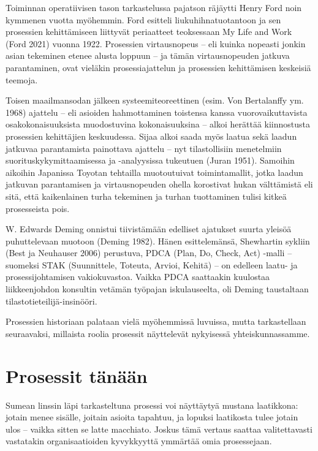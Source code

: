 \documentclass[
  finnish,
  letterpaper,
  DIV=11,
  numbers=noendperiod,
  oneside]{scrreprt}
\begin{document}
Toiminnan operatiivisen tason tarkastelussa pajatson räjäytti Henry Ford
noin kymmenen vuotta myöhemmin. Ford esitteli liukuhihnatuotantoon ja
sen prosessien kehittämiseen liittyvät periaatteet teoksessaan My Life
and Work (Ford 2021) vuonna 1922. Prosessien virtausnopeus -- eli kuinka
nopeasti jonkin asian tekeminen etenee alusta loppuun -- ja tämän
virtausnopeuden jatkuva parantaminen, ovat vieläkin prosessiajattelun ja
prosessien kehittämisen keskeisiä teemoja.

Toisen maailmansodan jälkeen systeemiteoreettinen (esim. {Von
Bertalanffy ym.} 1968) ajattelu -- eli asioiden hahmottaminen toistensa
kanssa vuorovaikuttavista osakokonaisuuksista muodostuvina
kokonaisuuksina -- alkoi herättää kiinnostusta prosessien kehittäjien
keskuudessa. Sijaa alkoi saada myös laatua sekä laadun jatkuvaa
parantamista painottava ajattelu -- nyt tilastollisiin menetelmiin
suorituskykymittaamisessa ja -analyysissa tukeutuen (Juran 1951).
Samoihin aikoihin Japanissa Toyotan tehtailla muotoutuivat
toimintamallit, jotka laadun jatkuvan parantamisen ja virtausnopeuden
ohella korostivat hukan välttämistä eli sitä, että kaikenlainen turha
tekeminen ja turhan tuottaminen tulisi kitkeä prosesseista pois.

W. Edwards Deming onnistui tiivistämään edelliset ajatukset suurta
yleisöä puhuttelevaan muotoon (Deming 1982). Hänen esittelemänsä,
Shewhartin sykliin (Best ja Neuhauser 2006) perustuva, PDCA (Plan, Do,
Check, Act) -malli -- suomeksi STAK (Suunnittele, Toteuta, Arvioi,
Kehitä) -- on edelleen laatu- ja prosessijohtamisen vakiokuvastoa.
Vaikka PDCA saattaakin kuulostaa liikkeenjohdon konsultin vetämän
työpajan iskulauseelta, oli Deming taustaltaan
tilastotieteilijä-insinööri.

Prosessien historiaan palataan vielä myöhemmissä luvuissa, mutta
tarkastellaan seuraavaksi, millaista roolia prosessit näyttelevät
nykyisessä yhteiskunnassamme.

\section{Prosessit tänään}\label{prosessit-tuxe4nuxe4uxe4n}

Sumean linssin läpi tarkasteltuna prosessi voi näyttäytyä mustana
laatikkona: jotain menee sisälle, joitain asioita tapahtuu, ja lopuksi
laatikosta tulee jotain ulos -- vaikka sitten se latte macchiato. Joskus
tämä vertaus saattaa valitettavasti vastatakin organisaatioiden
kyvykkyyttä ymmärtää omia prosessejaan.
\end{document}
